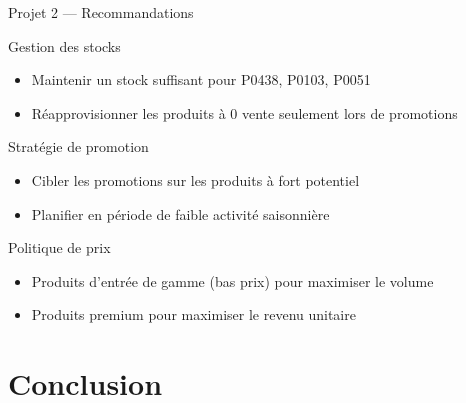 \documentclass{beamer}
\begin{document}
\begin{frame}{Projet 2 --- Recommandations}
  \begin{block}{Gestion des stocks}
    \begin{itemize}
      \item Maintenir un stock suffisant pour P0438, P0103, P0051
      \item Réapprovisionner les produits à 0 vente seulement lors de promotions
    \end{itemize}
  \end{block}

  \begin{block}{Stratégie de promotion}
    \begin{itemize}
      \item Cibler les promotions sur les produits à fort potentiel
      \item Planifier en période de faible activité saisonnière
    \end{itemize}
  \end{block}

  \begin{block}{Politique de prix}
    \begin{itemize}
      \item Produits d'entrée de gamme (bas prix) pour maximiser le volume
      \item Produits premium pour maximiser le revenu unitaire
    \end{itemize}
  \end{block}
\end{frame}

\section{Conclusion}
\end{document}

